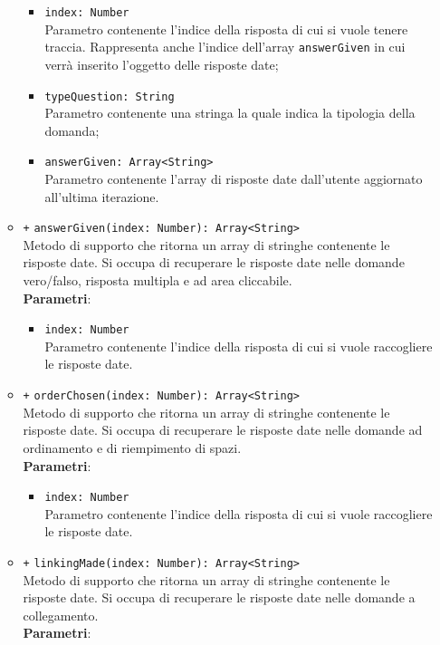 \begin{itemize}
\begin{itemize}
\begin{itemize}
			\item \texttt{index: Number} \\
			Parametro contenente l'indice della risposta di cui si vuole tenere traccia. Rappresenta anche l'indice dell'array \texttt{answerGiven} in cui verrà inserito l'oggetto delle risposte date;
			\item \texttt{typeQuestion: String} \\
			Parametro contenente una stringa la quale indica la tipologia della domanda;
			\item \texttt{answerGiven: Array<String>} \\
			Parametro contenente l'array di risposte date dall'utente aggiornato all'ultima iterazione.
		\end{itemize}
		\item \texttt{+} \texttt{answerGiven(index: Number): Array<String>} \\
		Metodo di supporto che ritorna un array di stringhe contenente le risposte date. Si occupa di recuperare le risposte date nelle domande vero/falso, risposta multipla e ad area cliccabile.\\
		\textbf{Parametri}:
		\begin{itemize}
			\item \texttt{index: Number} \\
			Parametro contenente l'indice della risposta di cui si vuole raccogliere le risposte date. 
		\end{itemize}
		\item \texttt{+} \texttt{orderChosen(index: Number): Array<String>} \\
		Metodo di supporto che ritorna un array di stringhe contenente le risposte date. Si occupa di recuperare le risposte date nelle domande ad ordinamento e di riempimento di spazi.\\
		\textbf{Parametri}:
		\begin{itemize}
			\item \texttt{index: Number} \\
			Parametro contenente l'indice della risposta di cui si vuole raccogliere le risposte date. 
		\end{itemize}
		\item \texttt{+} \texttt{linkingMade(index: Number): Array<String>} \\
		Metodo di supporto che ritorna un array di stringhe contenente le risposte date. Si occupa di recuperare le risposte date nelle domande a collegamento.\\
		\textbf{Parametri}:

\end{itemize}
\end{itemize}
